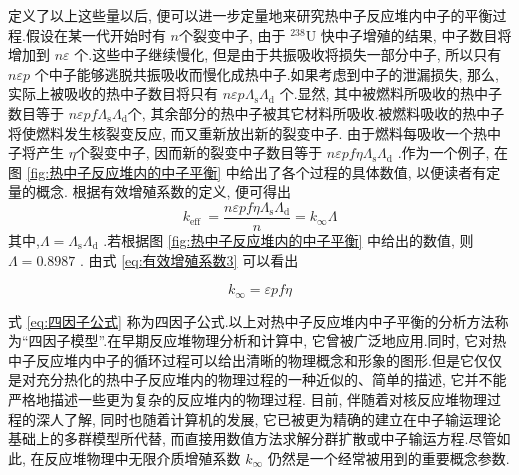 \documentclass{Sichuan Normal University}
\begin{document}
定义了以上这些量以后, 便可以进一步定量地来研究热中子反应堆内中子的平衡过程.假设在某一代开始时有 $n$个裂变中子, 由于 ${ }^{238} \mathrm{U}$ 快中子增殖的结果, 中子数目将增加到 $n \varepsilon$ 个.这些中子继续慢化, 但是由于共振吸收将损失一部分中子, 所以只有 $n \varepsilon p$ 个中子能够逃脱共振吸收而慢化成热中子.如果考虑到中子的泄漏损失, 
那么, 实际上被吸收的热中子数目将只有 $n \varepsilon p \Lambda_{\mathrm{s}} \Lambda_{\mathrm{d}}$ 个.显然, 其中被燃料所吸收的热中子数目等于 $n \varepsilon p f \Lambda_{\mathrm{s}} \Lambda_{\mathrm{d}}$个, 其余部分的热中子被其它材料所吸收.被燃料吸收的热中子将使燃料发生核裂变反应, 而又重新放出新的裂变中子.
由于燃料每吸收一个热中子将产生 $\eta$个裂变中子, 因而新的裂变中子数目等于 $n \varepsilon p f \eta \Lambda_{\mathrm{s}} \Lambda_{\mathrm{d}}$ .作为一个例子, 在图 \ref{fig:热中子反应堆内的中子平衡} 中给出了各个过程的具体数值, 以便读者有定量的概念.
根据有效增殖系数的定义, 便可得出
\begin{equation}
k_{\text {eff }}=\frac{n \varepsilon p f \eta \Lambda_{\mathrm{s}} \Lambda_{\mathrm{d}}}{n}=k_{\infty} \Lambda
\end{equation}
其中,$\Lambda=\Lambda_{\mathrm{s}} \Lambda_{\mathrm{d}}$ .若根据图 \ref{fig:热中子反应堆内的中子平衡} 中给出的数值, 则 $\Lambda=0.8987$ .
由式 \eqref{eq:有效增殖系数3} 可以看出

\begin{equation}
k_{\infty}=\varepsilon p f \eta
\label{eq:四因子公式}
\end{equation}

式 \eqref{eq:四因子公式} 称为四因子公式.以上对热中子反应堆内中子平衡的分析方法称为“四因子模型”.在早期反应堆物理分析和计算中, 它曾被广泛地应用.同时, 它对热中子反应堆内中子的循环过程可以给出清晰的物理概念和形象的图形.但是它仅仅是对充分热化的热中子反应堆内的物理过程的一种近似的、简单的描述, 它并不能严格地描述一些更为复杂的反应堆内的物理过程.
目前, 伴随着对核反应堆物理过程的深人了解, 同时也随着计算机的发展, 它已被更为精确的建立在中子输运理论基础上的多群模型所代替, 而直接用数值方法求解分群扩散或中子输运方程.尽管如此, 在反应堆物理中无限介质增殖系数 $k_{\infty}$ 仍然是一个经常被用到的重要概念参数.
  
\end{document}
